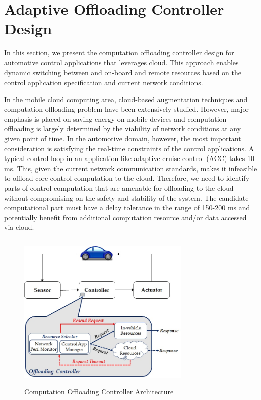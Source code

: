 \section{Adaptive Offloading Controller Design}
\label{sec:Off_Ctlr}
In this section, we present the computation offloading controller design for automotive control applications that leverages cloud. This approach enables dynamic switching between and on-board and remote resources based on the control application specification and current network conditions.

In the mobile cloud computing area, cloud-based augmentation techniques \cite{ref:MCC_aug, ref:cloudlet} and computation offloading problem \cite{ref:MCC_survey1, ref:MCC_survey2} have been extensively studied. However, major emphasis is placed on saving energy on mobile devices and computation offloading is largely determined by the viability of network conditions at any given point of time. In the automotive domain, however, the most important consideration is satisfying the real-time constraints of the control applications. A typical control loop in an application like adaptive cruise control (ACC) takes 10 ms. This, given the current network communication standards, makes it infeasible to offload core control computation to the cloud. Therefore, we need to identify parts of control computation that are amenable for offloading to the cloud without compromising on the safety and stability of the system. The candidate computational part must have a delay tolerance in the range of 150-200 ms and potentially benefit from additional computation resource and/or data accessed via cloud. 

\begin{figure}
\includegraphics[width=3.25in,height=3in]{off_ctlr.jpg}
 \caption{Computation Offloading Controller Architecture \label{fig:OFF_CTLR}}
\end{figure}

